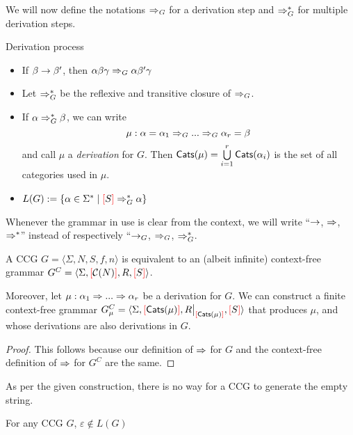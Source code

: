 \documentclass[main.tex]{subfiles}
\begin{document}
We will now define the notations $\Rightarrow_G$ for a derivation step
and $\Rightarrow^*_G$ for multiple derivation steps.
\begin{defn}
    Derivation process
    \begin{itemize}
        \item If $\beta \rightarrow \beta'$, then $\alpha \beta \gamma \Rightarrow_G \alpha \beta' \gamma$
        \item Let $\Rightarrow^*_G$ be the reflexive and transitive closure of $\Rightarrow_G$.
        \item If $\alpha \Rightarrow^*_G \beta$, we can write
            \[ \mu: \alpha = \alpha_1 \Rightarrow_G ... \Rightarrow_G \alpha_r = \beta \]
            and call $\mu$ a \emph{derivation} for $G$. Then $\mathsf{Cats}( \mu ) = \bigcup\limits_{i=1}^{r} \mathsf{Cats}( \alpha_i )$
            is the set of all categories used in $\mu$.
        \item $L(G) := \{ \alpha \in \Sigma^* \mid \textcolor{red}{[} S \textcolor{red}{]} \Rightarrow^*_G \alpha \}$
    \end{itemize}
\end{defn}

\begin{convention}
    Whenever the grammar in use is clear from the context, we will write
    ``$\rightarrow$, $\Rightarrow$, $\Rightarrow^*$'' instead of respectively
    ``$\rightarrow_G$, $\Rightarrow_G$, $\Rightarrow^*_G$.
\end{convention}

\begin{prop}\label{prop:cfg}
    A CCG $G = \langle \Sigma, N, S, f, n \rangle$ is equivalent to an
    (albeit infinite) context-free grammar
    $G^C = \langle \Sigma, \textcolor{red}{[} \mathcal{C}( N ) \textcolor{red}{]}, R, \textcolor{red}{[} S \textcolor{red}{]} \rangle$.

    Moreover, let $\mu: \alpha_1 \Rightarrow ... \Rightarrow \alpha_r$
    be a derivation for $G$.
    We can construct a finite context-free grammar
    $G_\mu^C = \langle \Sigma, \lb \catsin{\mu} \rb, \restr{R}{\lb \catsin{\mu} \rb}, \lb S \rb \rangle$
    that produces $\mu$, and whose derivations are also derivations in $G$.
\end{prop}
\begin{proof}
    This follows because our definition of $\Rightarrow$ for $G$ and the context-free
    definition of $\Rightarrow$ for $G^C$ are the same.
\end{proof}

As per the given construction, there is no way for a CCG to generate the empty
string.
\begin{property}
    For any CCG $G$, $\varepsilon \notin L(G)$
\end{property}
\end{document}
